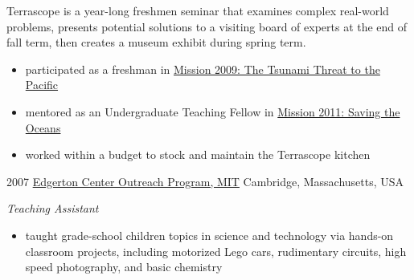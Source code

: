 \documentclass[]{friggeri-cv}
\begin{document}
\begin{entrylist}
{	Terrascope is a year-long freshmen seminar that examines complex real-world problems, presents potential solutions to a visiting board of experts at the end of fall term, then creates a museum exhibit during spring term. 
	\begin{itemize}
		\item participated as a freshman in \href{http://web.mit.edu/12.000/www/m2009/finalwebsite/}{Mission 2009: The Tsunami Threat to the Pacific}
		\item mentored as an Undergraduate Teaching Fellow in \href{http://web.mit.edu/12.000/www/m2011/finalwebsite/}{Mission 2011: Saving the Oceans}
		\item worked within a budget to stock and maintain the Terrascope kitchen
	\end{itemize}
	}
  \entry
	{2007}
	{\href{http://edgerton.mit.edu/outreach}{Edgerton Center Outreach Program, MIT}}
	{Cambridge, Massachusetts, USA}
	{\emph{Teaching Assistant} 
	\begin{itemize}
		\item taught grade-school children topics in science and technology via hands-on classroom projects, including motorized Lego cars, rudimentary circuits, high speed photography, and basic chemistry
	\end{itemize}
	}
\end{entrylist}
\end{document}
